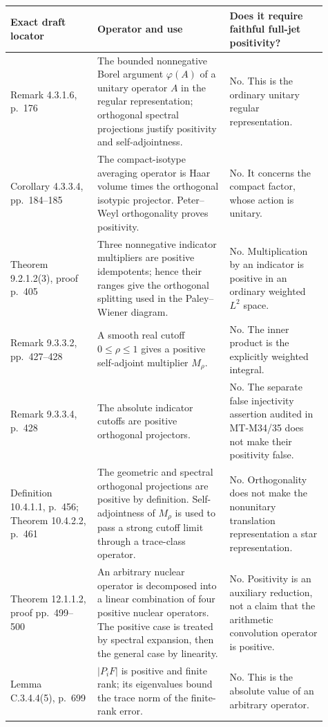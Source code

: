 \begin{longtable}{p{0.25\linewidth}p{0.38\linewidth}p{0.28\linewidth}}
\hline
Exact draft locator & Operator and use & Does it require faithful
full-jet positivity?\\
\hline
\endhead
Remark 4.3.1.6, p.~176 & The bounded nonnegative Borel argument
$\varphi(A)$ of a unitary operator $A$ in the regular representation;
orthogonal spectral projections justify positivity and self-adjointness.
& No. This is the ordinary unitary regular representation.\\[3pt]
Corollary 4.3.3.4, pp.~184--185 & The compact-isotype averaging
operator is Haar volume times the orthogonal isotypic projector.
Peter--Weyl orthogonality proves positivity.
& No. It concerns the compact factor, whose action is unitary.\\[3pt]
Theorem 9.2.1.2(3), proof p.~405 & Three nonnegative indicator
multipliers are positive idempotents; hence their ranges give the
orthogonal splitting used in the Paley--Wiener diagram.
& No. Multiplication by an indicator is positive in an ordinary
weighted $L^2$ space.\\[3pt]
Remark 9.3.3.2, pp.~427--428 & A smooth real cutoff
$0\le\rho\le1$ gives a positive self-adjoint multiplier $M_\rho$.
& No. The inner product is the explicitly weighted integral.\\[3pt]
Remark 9.3.3.4, p.~428 & The absolute indicator cutoffs are positive
orthogonal projectors.
& No. The separate false injectivity assertion audited in MT-M34/35
does not make their positivity false.\\[3pt]
Definition 10.4.1.1, p.~456; Theorem 10.4.2.2, p.~461 & The
geometric and spectral orthogonal projections are positive by
definition. Self-adjointness of $M_\rho$ is used to pass a strong
cutoff limit through a trace-class operator.
& No. Orthogonality does not make the nonunitary translation
representation a star representation.\\[3pt]
Theorem 12.1.1.2, proof pp.~499--500 & An arbitrary nuclear
operator is decomposed into a linear combination of four positive
nuclear operators. The positive case is treated by spectral
expansion, then the general case by linearity.
& No. Positivity is an auxiliary reduction, not a claim that the
arithmetic convolution operator is positive.\\[3pt]
Lemma C.3.4.4(5), p.~699 & $|P_iF|$ is positive and finite rank;
its eigenvalues bound the trace norm of the finite-rank error.
& No. This is the absolute value of an arbitrary operator.\\[3pt]

\end{longtable}
